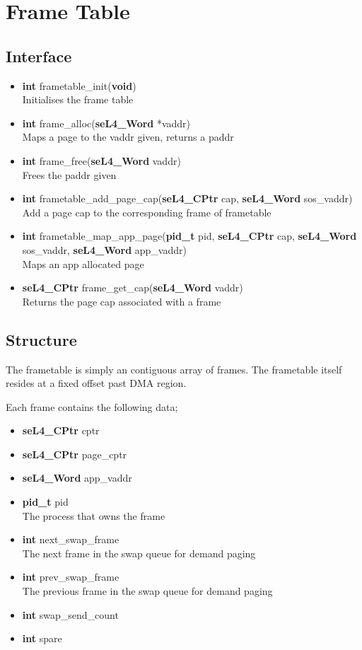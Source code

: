 \documentclass[12pt]{article}
\begin{document}
\clearpage
\section{Frame Table}
\subsection{Interface}
\begin{itemize}
\item \textbf{int} frametable\_init(\textbf{void})\\
Initialises the frame table
\item \textbf{int} frame\_alloc(\textbf{seL4\_Word} *vaddr)\\
Maps a page to the vaddr given, returns a paddr
\item \textbf{int} frame\_free(\textbf{seL4\_Word} vaddr)\\
Frees the paddr given
\item \textbf{int} frametable\_add\_page\_cap(\textbf{seL4\_CPtr} cap, \textbf{seL4\_Word} sos\_vaddr)\\
Add a page cap to the corresponding frame of frametable
\item \textbf{int} frametable\_map\_app\_page(\textbf{pid\_t} pid, \textbf{seL4\_CPtr} cap, \textbf{seL4\_Word} sos\_vaddr, \textbf{seL4\_Word} app\_vaddr)\\
Maps an app allocated page
\item \textbf{seL4\_CPtr} frame\_get\_cap(\textbf{seL4\_Word} vaddr)\\
Returns the page cap associated with a frame
\end{itemize}
\subsection{Structure}
The frametable is simply an contiguous array of frames. The frametable itself resides at a fixed offset past DMA region.

Each frame contains the following data;
\begin{itemize}
\item \textbf{seL4\_CPtr} cptr
\item \textbf{seL4\_CPtr} page\_cptr
\item \textbf{seL4\_Word} app\_vaddr
\item \textbf{pid\_t} pid\\
The process that owns the frame
\item \textbf{int} next\_swap\_frame\\
The next frame in the swap queue for demand paging
\item \textbf{int} prev\_swap\_frame\\
The previous frame in the swap queue for demand paging
\item \textbf{int} swap\_send\_count
\item \textbf{int} spare
\end{itemize}
\end{document}

